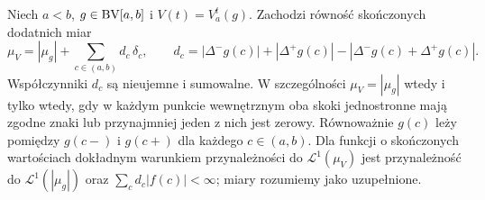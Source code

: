 \begin{twierdzenie}\label{ma1:kh:thm:ks-variation-measure-defect}
Niech $a<b$, $g\in\mathrm{BV}[a,b]$ i $V(t)=V_a^t(g)$. Zachodzi równość skończonych dodatnich miar
\[
 \mu_V=|\mu_g|+\sum_{c\in(a,b)}d_c\,\delta_c,
 \qquad
 d_c=|\Delta^-g(c)|+|\Delta^+g(c)|
      -|\Delta^-g(c)+\Delta^+g(c)|.
\]
Współczynniki $d_c$ są nieujemne i sumowalne. W szczególności $\mu_V=|\mu_g|$ wtedy i tylko wtedy, gdy w każdym punkcie wewnętrznym oba skoki jednostronne mają zgodne znaki lub przynajmniej jeden z nich jest zerowy. Równoważnie $g(c)$ leży pomiędzy $g(c-)$ i $g(c+)$ dla każdego $c\in(a,b)$. Dla funkcji o skończonych wartościach dokładnym warunkiem przynależności do $\mathcal L^1(\mu_V)$ jest przynależność do $\mathcal L^1(|\mu_g|)$ oraz $\sum_c d_c|f(c)|<\infty$; miary rozumiemy jako uzupełnione.
\end{twierdzenie}
